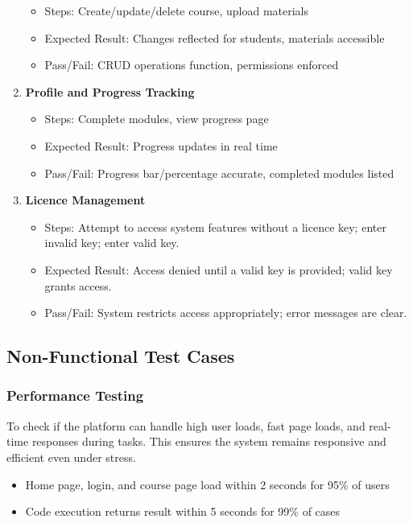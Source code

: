 \documentclass[a4paper,11pt]{scrartcl}
\begin{document}
\begin{enumerate}[leftmargin=*]
        \begin{itemize}
            \item Steps: Create/update/delete course, upload materials
            \item Expected Result: Changes reflected for students, materials accessible
            \item Pass/Fail: CRUD operations function, permissions enforced
        \end{itemize}
    \item \textbf{Profile and Progress Tracking}
        \begin{itemize}
            \item Steps: Complete modules, view progress page
            \item Expected Result: Progress updates in real time
            \item Pass/Fail: Progress bar/percentage accurate, completed modules listed
        \end{itemize}
        \item \textbf{Licence Management}
        \begin{itemize}
            \item Steps: Attempt to access system features without a licence key; enter invalid key; enter valid key.
            \item Expected Result: Access denied until a valid key is provided; valid key grants access.
            \item Pass/Fail: System restricts access appropriately; error messages are clear.
        \end{itemize}
\end{enumerate}

\subsection{Non-Functional Test Cases}

\subsubsection{Performance Testing}
To check if the platform can handle high user loads, fast page loads, and real-time responses during tasks. This ensures the system remains responsive and efficient even under stress.
\begin{itemize}[leftmargin=*]
    \item Home page, login, and course page load within 2 seconds for 95\% of users
    \item Code execution returns result within 5 seconds for 99\% of cases
\end{itemize}
\end{document}
